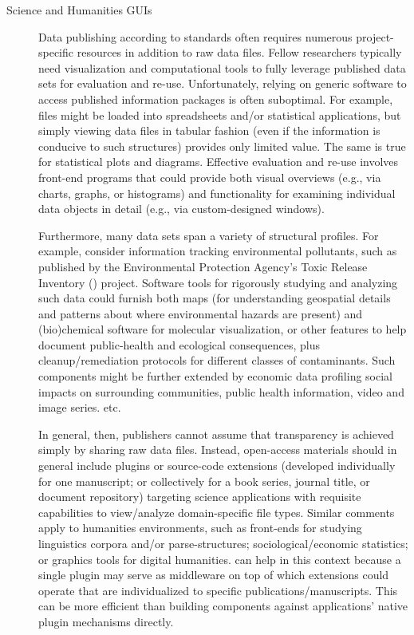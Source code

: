 \documentclass[11pt]{article}
\begin{document}
{{\begin{description}
\item[Science and Humanities GUIs]   Data publishing 
according to \FAIRsharing{} standards often requires 
numerous project-specific resources in addition 
to raw data files.  Fellow researchers typically 
need visualization and computational tools to 
fully leverage published data sets for 
evaluation and re-use.  Unfortunately, relying on generic 
software to access published information packages is often 
suboptimal.  For example, \CSV{} files might be 
loaded into spreadsheets and/or statistical applications, 
but simply viewing data files in tabular fashion 
(even if the information is conducive to such structures) 
provides only limited value.  The same is true for 
statistical plots and diagrams.  Effective evaluation 
and re-use involves front-end programs that could provide 
both visual overviews (e.g., via charts, graphs, or histograms) 
and functionality for examining individual data objects 
in detail (e.g., via custom-designed \GUI{} windows).

\pseudoIndent{}  Furthermore, many data sets span a variety of  
structural profiles.  For example, consider information 
tracking environmental pollutants, such as published 
by the Environmental Protection Agency's 
Toxic Release Inventory (\TRI{}) project.
Software tools for rigorously studying and analyzing such data could 
furnish both \GIS{} maps (for understanding 
geospatial details and patterns about where environmental 
hazards are present) and (bio)chemical software 
for molecular visualization, or other features to 
help document public-health and eco\-logical 
consequences, plus cleanup/remediation protocols for 
different classes of contaminants.  Such components 
might be further extended by economic data 
profiling social impacts on surrounding communities, 
public health information, video and image series. etc.

\pseudoIndent{}  In general, then, publishers cannot 
assume that \FAIR{} transparency is achieved simply by 
sharing raw data files.  Instead, open-access materials should 
in general include plugins or source-code extensions (developed 
individually for one manuscript; or collectively 
for a book series, journal title, or document repository) 
targeting science applications with requisite capabilities 
to view/analyze domain-specific file types.  Similar 
comments apply to humanities environments, such as 
front-ends for studying linguistics corpora and/or 
parse-structures; sociological/economic 
statistics; or graphics tools for digital humanities.
\lPacTk{} can help in this context 
because a single \PacTk{} plugin may serve as middleware 
on top of which extensions could operate that are individualized 
to specific publications/manuscripts.  This can be more 
efficient than building components against applications' 
native plugin mechanisms directly. 


\end{description}}}
\end{document}
